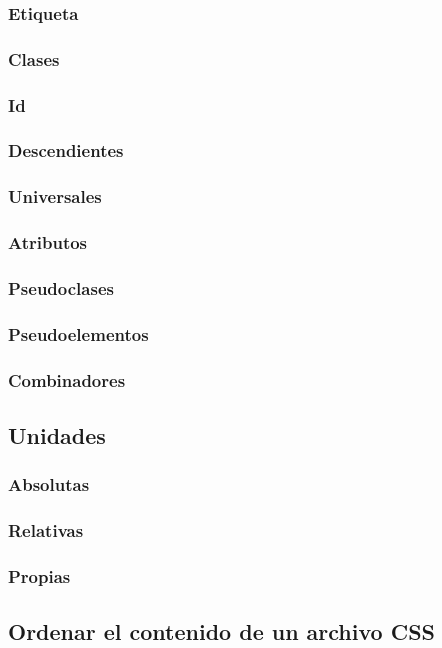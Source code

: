 \documentclass[12pt]{report}
\begin{document}
			\subsubsection{Etiqueta}
			\subsubsection{Clases}
			\subsubsection{Id}
			\subsubsection{Descendientes}
			\subsubsection{Universales}
			\subsubsection{Atributos}
			\subsubsection{Pseudoclases}
			\subsubsection{Pseudoelementos}
			\subsubsection{Combinadores}
		\subsection{Unidades}
			\subsubsection{Absolutas}
			\subsubsection{Relativas}
			\subsubsection{Propias}
		\subsection{Ordenar el contenido de un archivo CSS}
\end{document}
